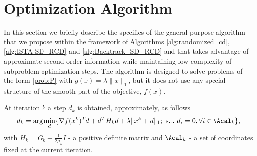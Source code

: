 \documentclass[11pt]{article}
\numberwithin{equation}{section}
\begin{document}
\section{Optimization Algorithm}
\label{sec:alg}

In this section we briefly describe the specifics of the general purpose algorithm that we propose within the framework of Algorithms \ref{alg:randomized_cd}, 
\ref{alg:ISTA-SD_RCD} and \ref{alg:Backtrack_SD_RCD} and that takes advantage of approximate second order information while maintaining low complexity of subproblem optimization steps.
The algorithm is designed to solve problems of the form \eqref{prob:P} with $g(x)=\lambda \|x\|_1$, but it does not use any special structure of the smooth part of the objective, $f(x)$.




 At iteration $k$ a step $d_k$  is obtained, approximately, as follows
\begin{equation}
    \label{equ:compute_d_outer_Ak}
    \nonumber d_k = \arg\min_{d} \{\nabla f(x^k)^T d + d^T H_k d + \lambda\|x^k + d\|_1; \ \mbox{s.t.}~ d_i = 0, \forall i \in \Acal_k\},
\end{equation}
with $H_k=G_k+\frac{1}{2\mu_k}I$ - a positive definite matrix  and $\Acal_k$ -  a set of coordinates fixed at the current iteration.
\end{document}
